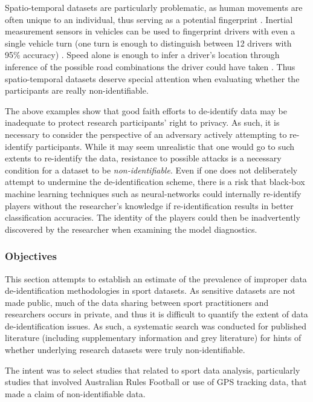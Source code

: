 Spatio-temporal datasets are particularly problematic, as human movements are often unique to an individual, thus serving as a potential fingerprint \cite{DeMontjoye2013}. Inertial measurement sensors in vehicles can be used to fingerprint drivers with even a single vehicle turn (one turn is enough to distinguish between 12 drivers with 95\% accuracy) \cite{Chen2017}. Speed alone is enough to infer a driver's location through inference of the possible road combinations the driver could have taken \cite{Firner2014}. Thus spatio-temporal datasets deserve special attention when evaluating whether the participants are really non-identifiable.

The above examples show that good faith efforts to de-identify data may be inadequate to protect research participants' right to privacy. As such, it is necessary to consider the perspective of an adversary actively attempting to re-identify participants. While it may seem unrealistic that one would go to such extents to re-identify the data, resistance to possible attacks is a necessary condition for a dataset to be \textit{non-identifiable}. Even if one does not deliberately attempt to undermine the de-identification scheme, there is a risk that black-box machine learning techniques such as neural-networks could internally re-identify players without the researcher's knowledge if re-identification results in better classification accuracies. The identity of the players could then be inadvertently discovered by the researcher when examining the model diagnostics.

\subsubsection{Objectives}

This section attempts to establish an estimate of the prevalence of improper data de-identification methodologies in sport datasets. As sensitive datasets are not made public, much of the data sharing between sport practitioners and researchers occurs in private, and thus it is difficult to quantify the extent of data de-identification issues. As such, a systematic search was conducted for published literature (including supplementary information and grey literature) for hints of whether underlying research datasets were truly non-identifiable. %

The intent was to select studies that related to sport data analysis, particularly studies that involved Australian Rules Football or use of GPS tracking data, that made a claim of non-identifiable data.

